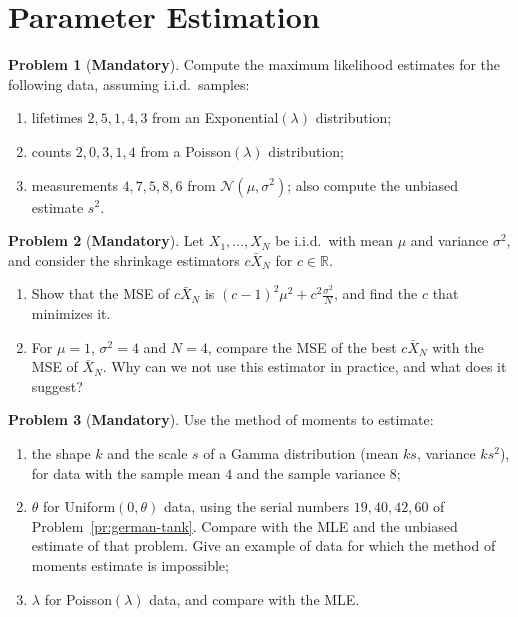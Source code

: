 \documentclass[11pt]{article}
\theoremstyle{definition}
\newtheorem{problem}{Problem}[section]
\newcommand{\mandatory}{\textcolor{red!70!black}{\textbf{Mandatory}}}
\begin{document}
\section{Parameter Estimation}

\begin{problem}[\mandatory]\label{pr:mle-data}
    Compute the maximum likelihood estimates for the following data, assuming i.i.d.\ samples:
    \begin{enumerate}[label=(\alph*)]
        \item lifetimes $2, 5, 1, 4, 3$ from an Exponential$(\lambda)$ distribution;
        \item counts $2, 0, 3, 1, 4$ from a Poisson$(\lambda)$ distribution;
        \item measurements $4, 7, 5, 8, 6$ from $\mathcal{N}(\mu, \sigma^2)$; also compute the unbiased estimate $s^2$.
    \end{enumerate}
\end{problem}

\begin{problem}[\mandatory]\label{pr:shrinkage}
    Let $X_1, \ldots, X_N$ be i.i.d.\ with mean $\mu$ and variance $\sigma^2$, and consider the shrinkage estimators $c\bar X_N$ for $c \in \mathbb{R}$.
    \begin{enumerate}[label=(\alph*)]
        \item Show that the MSE of $c\bar X_N$ is $(c - 1)^2\mu^2 + c^2\frac{\sigma^2}{N}$, and find the $c$ that minimizes it.
        \item For $\mu = 1$, $\sigma^2 = 4$ and $N = 4$, compare the MSE of the best $c\bar X_N$ with the MSE of $\bar X_N$. Why can we not use this estimator in practice, and what does it suggest?
    \end{enumerate}
\end{problem}

\begin{problem}[\mandatory]\label{pr:mom}
    Use the method of moments to estimate:
    \begin{enumerate}[label=(\alph*)]
        \item the shape $k$ and the scale $s$ of a Gamma distribution (mean $ks$, variance $ks^2$), for data with the sample mean $4$ and the sample variance $8$;
        \item $\theta$ for Uniform$(0, \theta)$ data, using the serial numbers $19, 40, 42, 60$ of Problem~\ref{pr:german-tank}. Compare with the MLE and the unbiased estimate of that problem. Give an example of data for which the method of moments estimate is impossible;
        \item $\lambda$ for Poisson$(\lambda)$ data, and compare with the MLE.
    \end{enumerate}
\end{problem}
\end{document}
